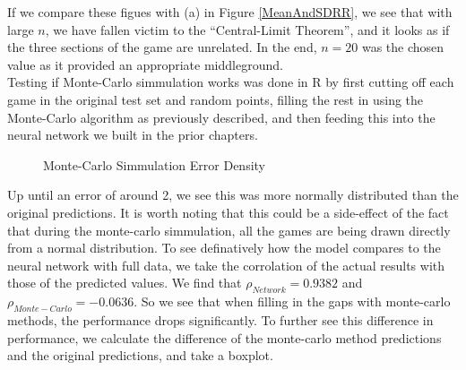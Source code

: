 If we compare these figues with (a) in Figure \ref{MeanAndSDRR}, we see that with large $n$, we have fallen victim to the ``Central-Limit Theorem'', and it looks as if the three 
sections of the game are unrelated. In the end, $n=20$ was the chosen value as it provided an appropriate middleground. \\

Testing if Monte-Carlo simmulation works was done in R by first cutting off each game in the original test set and random points, filling the rest in using the Monte-Carlo algorithm 
as previously described, and then feeding this into the neural network we built in the prior chapters. 

\begin{figure}[h]
    \centering
    \qquad
    \caption{Monte-Carlo Simmulation Error Density}
    \label{mcerror}
\end{figure}

Up until an error of around 2, we see this was more normally distributed than the original predictions. It is worth noting that this could be a side-effect of the fact that during the monte-carlo 
simmulation, all the games are being drawn directly from a normal distribution. To see definatively how the model compares to the neural network with full data, we take the corrolation of the actual results with those of the predicted values. 
We find that $\rho_{Network} = 0.9382$ and $\rho_{Monte-Carlo} = -0.0636$. So we see that when filling in the gaps with monte-carlo methods, the performance drops significantly. To further see this difference in performance, 
we calculate the difference of the monte-carlo method predictions and the original predictions, and take a boxplot. \\

